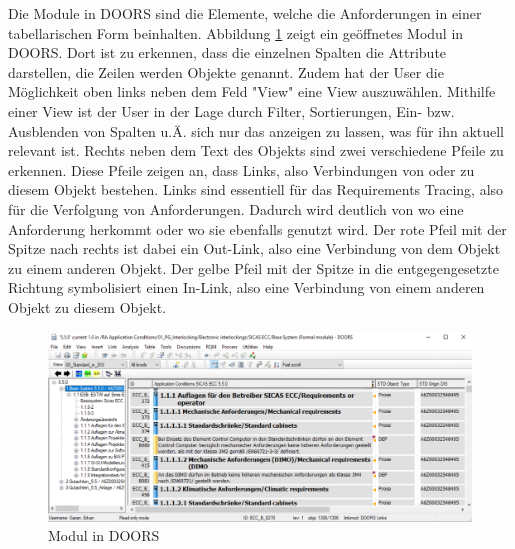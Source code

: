 Die Module in DOORS sind die Elemente, welche die Anforderungen in einer tabellarischen Form beinhalten. Abbildung \ref*{fig:Doors Modul} zeigt ein geöffnetes Modul in DOORS. Dort ist zu erkennen,
dass die einzelnen Spalten die Attribute darstellen, die Zeilen werden Objekte genannt. Zudem hat der User die Möglichkeit oben links neben dem Feld "View" eine View auszuwählen. Mithilfe einer View 
ist der User in der Lage durch Filter, Sortierungen, Ein- bzw. Ausblenden von Spalten u.Ä. sich nur das anzeigen zu lassen, was für ihn aktuell relevant ist. Rechts neben dem Text des Objekts sind 
zwei verschiedene Pfeile zu erkennen. Diese Pfeile zeigen an, dass Links, also Verbindungen von oder zu diesem Objekt bestehen. Links sind essentiell für das Requirements Tracing, also für die
Verfolgung von Anforderungen. Dadurch wird deutlich von wo eine Anforderung herkommt oder wo sie ebenfalls genutzt wird. Der rote Pfeil mit der Spitze nach rechts ist dabei ein Out-Link, also eine
Verbindung von dem Objekt zu einem anderen Objekt. Der gelbe Pfeil mit der Spitze in die entgegengesetzte Richtung symbolisiert einen In-Link, also eine Verbindung von einem anderen Objekt zu diesem 
Objekt. 

\begin{figure}[H]
    \centering
    \includegraphics[width = \textwidth]{abbildungen/Modul in Doors.PNG}
    \caption{Modul in DOORS}
    \label{fig:Doors Modul}
\end{figure}